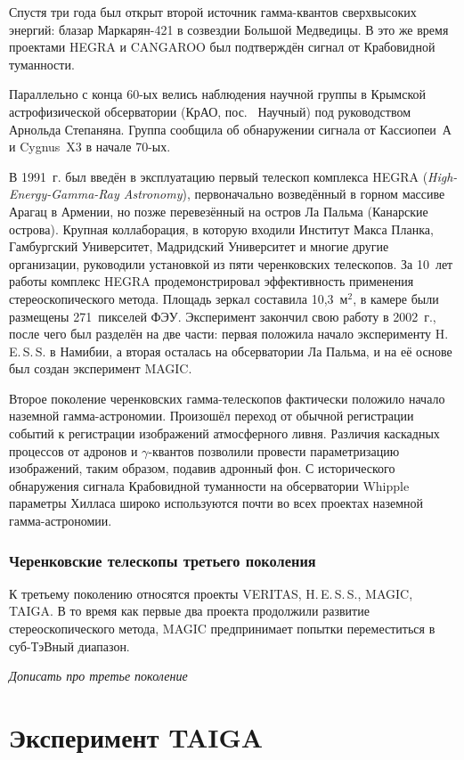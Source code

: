 \documentclass[magd,floatypics,numeref]{msudipl} %
\begin{document}
Спустя три года был открыт второй источник гамма-квантов сверхвысоких энергий: блазар Маркарян-421 в созвездии Большой Медведицы. В это же время проектами HEGRA и CANGAROO был подтверждён сигнал от Крабовидной туманности.

Параллельно с конца 60-ых велись наблюдения научной группы в Крымской астрофизической обсерватории (КрАО, пос.~ Научный) под руководством Арнольда Степаняна.  Группа сообщила об обнаружении сигнала от Кассиопеи~А и Cygnus~X3 в начале 70-ых. 

В 1991~г. был введён в эксплуатацию первый телескоп комплекса HEGRA (\textit{High-Energy-Gamma-Ray Astronomy}), первоначально возведённый в горном массиве Арагац в Армении, но позже перевезённый на остров Ла Пальма (Канарские острова). Крупная коллаборация, в которую входили Институт Макса Планка, Гамбургский Университет, Мадридский Университет и многие другие организации, руководили установкой из пяти черенковских телескопов. За 10~лет работы комплекс HEGRA продемонстрировал эффективность применения стереоскопического метода. Площадь зеркал составила 10,3~$\text{м}^2$, в камере были размещены 271~пикселей ФЭУ. Эксперимент закончил свою работу в 2002~г., после чего был разделён на две части: первая положила начало эксперименту H.\,E.\,S.\,S. в Намибии, а вторая осталась на обсерватории Ла Пальма, и на её основе был создан эксперимент MAGIC. 

Второе поколение черенковских гамма-телескопов фактически положило начало наземной гамма-астрономии. Произошёл переход от обычной регистрации событий к регистрации изображений атмосферного ливня. Различия каскадных процессов от адронов и $\gamma$-квантов позволили провести параметризацию изображений, таким образом, подавив адронный фон. С исторического обнаружения сигнала Крабовидной туманности на обсерватории Whipple параметры Хилласа широко используются почти во всех проектах наземной гамма-астрономии.
\subsection{Черенковские телескопы третьего поколения}
К третьему поколению относятся проекты VERITAS, H.\,E.\,S.\,S., MAGIC, TAIGA. В то время как первые два проекта продолжили развитие стереоскопического метода, MAGIC предпринимает попытки переместиться в суб-ТэВный диапазон. 

\textit{Дописать про третье поколение}
\chapter{Эксперимент TAIGA}
\end{document}
